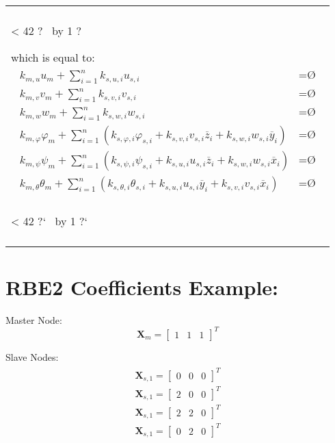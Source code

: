 \documentclass[10pt,b5paper,titlepage]{book}
\newcommand{\m}{\mathbf}
\newcommand{\Null}{\text{\O}}
\newenvironment{bbox}[1][0.96]
{
    \begin{center}
        \begin{tabular}{|p{#1\textwidth}|}
            \hline\\
}
{
            \\\\\hline
        \end{tabular}
    \end{center}
}
\newcommand{\repeatit}[3][10]{%
    \myloopcounter1%
    \loop\ifnum\myloopcounter < #1
    #2#3%
    \advance\myloopcounter by 1%
    \repeat%
    #2%
}
\newenvironment{qbox}
{
\begin{center}
    \repeatit[42]{?}{\ }
\end{center}
}
{
\begin{center}
    \repeatit[42]{?`}{\ }
\end{center}
}
\newenvironment{eqarray}
{
    \begin{eqnarray}
        \begin{aligned}
}
{
        \end{aligned}
    \end{eqnarray}
}
\begin{document}
\begin{bbox}[0.95]
\begin{qbox}
        which is equal to:
        \begin{eqarray}
            k_{m,u} u_m + \sum_{i=1}^n k_{s,u,i} u_{s,i} &= \Null \\
            k_{m,v} v_m + \sum_{i=1}^n k_{s,v,i} v_{s,i} &= \Null \\
            k_{m,w} w_m + \sum_{i=1}^n k_{s,w,i} w_{s,i} &= \Null \\
            k_{m,\varphi} \varphi_m + \sum_{i=1}^n
            \left(
                k_{s,\varphi,i} \varphi_{s,i}
                + k_{s,v,i} v_{s,i} \overline{z}_{i}
                + k_{s,w,i} w_{s,i} \overline{y}_{i}
        \right) &= \Null \\
            k_{m,\psi} \psi_m + \sum_{i=1}^n
            \left(
                k_{s,\psi,i} \psi_{s,i}
                + k_{s,u,i} u_{s,i} \overline{z}_{i}
                + k_{s,w,i} w_{s,i} \overline{x}_{i}
            \right) &= \Null \\
            k_{m,\theta} \theta_m + \sum_{i=1}^n
            \left(
                k_{s,\theta,i} \theta_{s,i}
                + k_{s,u,i} u_{s,i} \overline{y}_{i}
                + k_{s,v,i} v_{s,i} \overline{x}_{i}
            \right) &= \Null \\
        \end{eqarray}
    \end{qbox}

\end{bbox}

\section{RBE2 Coefficients Example:}

Master Node:
\begin{equation}
    \m{X}_m =
    \begin{bmatrix}
        1 & 1 & 1
    \end{bmatrix}^T
\end{equation}

Slave Nodes:
\begin{eqarray}
    \m{X}_{s,1} =
    \begin{bmatrix}
        0 & 0 & 0
    \end{bmatrix}^T \\
    \m{X}_{s,1} =
    \begin{bmatrix}
        2 & 0 & 0
    \end{bmatrix}^T \\
    \m{X}_{s,1} =
    \begin{bmatrix}
        2 & 2 & 0
    \end{bmatrix}^T \\
    \m{X}_{s,1} =
    \begin{bmatrix}
        0 & 2 & 0
    \end{bmatrix}^T \\
\end{eqarray}
\end{document}
